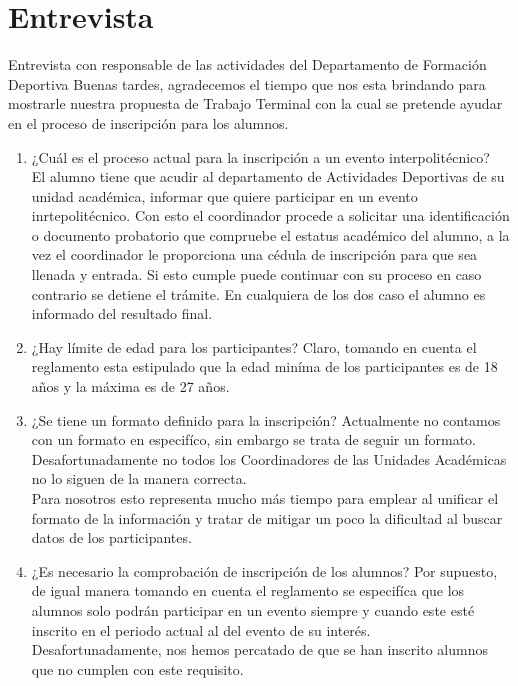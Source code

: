 \appendix
\clearpage
\addappheadtotoc
\appendixpage
	
	\chapter{Entrevista}
	\label{cuestionario}
	\noindent Entrevista con responsable de las actividades del Departamento de Formación Deportiva
	Buenas tardes, agradecemos el tiempo que nos esta brindando para mostrarle nuestra propuesta de Trabajo Terminal con la cual se pretende ayudar en el proceso de inscripción para los alumnos.
	
	\begin{enumerate}
		\item ¿Cuál es el proceso actual para la inscripción a un evento interpolitécnico?\\
		El alumno tiene que acudir al departamento de Actividades Deportivas de su unidad académica, informar que quiere participar en un evento inrtepolitécnico. Con esto el coordinador procede a solicitar una identificación o documento probatorio que compruebe el estatus académico del alumno, a la vez el coordinador le proporciona una cédula de inscripción para que sea llenada y entrada. Si esto cumple puede continuar con su proceso en caso contrario se detiene el trámite. En cualquiera de los dos caso el alumno es informado del resultado final.
		
		\item ¿Hay límite de edad para los participantes?
		Claro, tomando en cuenta el reglamento esta estipulado que la edad miníma de los participantes es de 18 años y la máxima es de 27 años.
		
		\item ¿Se tiene un formato definido para la inscripción?
		Actualmente no contamos con un formato en especifíco, sin embargo se trata de seguir un formato. Desafortunadamente no todos los Coordinadores de las Unidades Académicas no lo siguen de la manera correcta.\\ 
		Para nosotros esto representa mucho más tiempo para emplear al unificar el formato de la información y tratar de mitigar un poco la dificultad al buscar datos de los participantes.
		
		\item ¿Es necesario la comprobación de inscripción de los alumnos?
		Por supuesto, de igual manera tomando en cuenta el reglamento se especifíca que los alumnos solo podrán participar en un evento siempre y cuando este esté inscrito en el periodo actual al del evento de su interés.\\
		Desafortunadamente, nos hemos percatado de que se han inscrito alumnos que no cumplen con este requisito.
		

\end{enumerate}

